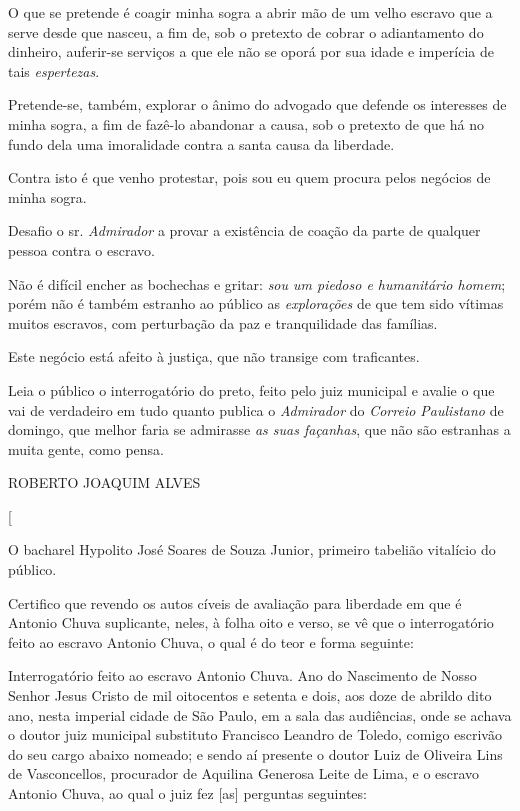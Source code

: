 {O que se pretende é coagir minha sogra a abrir mão de um velho escravo
que a serve desde que nasceu, a fim de, sob o pretexto de cobrar o
adiantamento do dinheiro, auferir-se serviços a que ele não se oporá por
sua idade e imperícia de tais \emph{espertezas}.

Pretende-se, também, explorar o ânimo do advogado que defende os
interesses de minha sogra, a fim de fazê-lo abandonar a causa, sob o
pretexto de que há no fundo dela uma imoralidade contra a santa causa da
liberdade.

Contra isto é que venho protestar, pois sou eu quem procura pelos
negócios de minha sogra.

Desafio o sr. \emph{Admirador} a provar a existência de coação da parte
de qualquer pessoa contra o escravo.

Não é difícil encher as bochechas e gritar: \emph{sou um piedoso e
humanitário homem}; porém não é também estranho ao público as
\emph{explorações} de que tem sido vítimas muitos escravos, com
perturbação da paz e tranquilidade das famílias.

Este negócio está afeito à justiça, que não transige com traficantes.

Leia o público o interrogatório do preto, feito pelo juiz municipal e
avalie o que vai de verdadeiro em tudo quanto publica o \emph{Admirador}
do \emph{Correio Paulistano} de domingo, que melhor faria se admirasse
\emph{as suas façanhas}, que não são estranhas a muita gente, como
pensa.

ROBERTO JOAQUIM ALVES

{[}\asterisc{}{]}

O bacharel Hypolito José Soares de Souza Junior, primeiro tabelião
vitalício do público.

Certifico que revendo os autos cíveis de avaliação para liberdade em que
é Antonio Chuva suplicante, neles, à folha oito e verso, se vê que o
interrogatório feito ao escravo Antonio Chuva, o qual é do teor e forma
seguinte:

Interrogatório feito ao escravo Antonio Chuva. Ano do Nascimento de
Nosso Senhor Jesus Cristo de mil oitocentos e setenta e dois, aos doze
de abrildo dito ano, nesta imperial cidade de São Paulo, em a sala das
audiências, onde se achava o doutor juiz municipal substituto Francisco
Leandro de Toledo, comigo escrivão do seu cargo abaixo nomeado; e sendo
aí presente o doutor Luiz de Oliveira Lins de Vasconcellos, procurador
de Aquilina Generosa Leite de Lima, e o escravo Antonio Chuva, ao qual o
juiz fez {[}as{]} perguntas seguintes:

}
